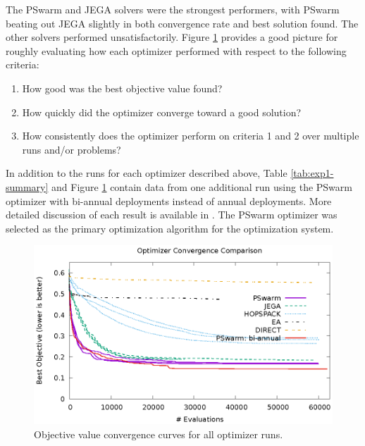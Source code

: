 The PSwarm and JEGA solvers were the strongest performers, with PSwarm beating
out JEGA slightly in both convergence rate and best solution found.  The other
solvers performed unsatisfactorily.  Figure \ref{fig:exp1-converge} provides a
good picture for roughly evaluating how each optimizer performed with respect
to the following criteria:

\begin{enumerate}

    \item How good was the best objective value found?

    \item How quickly did the optimizer converge toward a good solution?

    \item How consistently does the optimizer perform on criteria 1 and 2 over
        multiple runs and/or problems?

\end{enumerate}

In addition to the runs for each optimizer described above, Table
\ref{tab:exp1-summary} and Figure \ref{fig:exp1-converge} contain data from
one additional run using the PSwarm optimizer with bi-annual deployments
instead of annual deployments.  More detailed discussion of each result is
available in \cite{rwc-dissertation}.  The PSwarm optimizer was selected as
the primary optimization algorithm for the \Cyclus optimization system.

\begin{figure}
    \centering
    \includegraphics[width=1.0\textwidth]{converge.eps}
    \captionsetup{justification=centering}
    \caption[Experiment 1: optimizer convergence curves]{Objective value convergence curves for all optimizer runs.}
    \label{fig:exp1-converge}
\end{figure}

